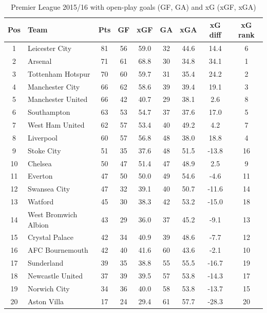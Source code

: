 \begin{table}[!h]
\centering
\small
\begin{tabular}{|c|l|c|c|c|c|c|c|c|}
\hline
\textbf{Pos} & \textbf{Team} & \textbf{Pts} & \textbf{GF} & \textbf{xGF} & \textbf{GA} & \textbf{xGA} & \textbf{xG diff} & \textbf{xG rank} \\
\hline
1 & Leicester City & 81 & 56 & 59.0 & 32 & 44.6 & 14.4 & 6 \\
2 & Arsenal & 71 & 61 & 68.8 & 30 & 34.8 & 34.1 & 1 \\
3 & Tottenham Hotspur & 70 & 60 & 59.7 & 31 & 35.4 & 24.2 & 2 \\
4 & Manchester City & 66 & 62 & 58.6 & 39 & 39.4 & 19.1 & 3 \\
5 & Manchester United & 66 & 42 & 40.7 & 29 & 38.1 & 2.6 & 8 \\
6 & Southampton & 63 & 53 & 54.7 & 37 & 37.6 & 17.0 & 5 \\
7 & West Ham United & 62 & 57 & 53.4 & 40 & 49.2 & 4.2 & 7 \\
8 & Liverpool & 60 & 57 & 56.8 & 48 & 38.0 & 18.8 & 4 \\
9 & Stoke City & 51 & 35 & 37.6 & 48 & 51.5 & -13.8 & 16 \\
10 & Chelsea & 50 & 47 & 51.4 & 47 & 48.9 & 2.5 & 9 \\
11 & Everton & 47 & 50 & 50.0 & 49 & 54.6 & -4.6 & 11 \\
12 & Swansea City & 47 & 32 & 39.1 & 40 & 50.7 & -11.6 & 14 \\
13 & Watford & 45 & 30 & 38.3 & 42 & 53.2 & -15.0 & 18 \\
14 & West Bromwich Albion & 43 & 29 & 36.0 & 37 & 45.2 & -9.1 & 13 \\
15 & Crystal Palace & 42 & 34 & 40.9 & 39 & 48.6 & -7.7 & 12 \\
16 & AFC Bournemouth & 42 & 40 & 41.6 & 60 & 43.6 & -2.1 & 10 \\
17 & Sunderland & 39 & 35 & 38.8 & 55 & 55.5 & -16.7 & 19 \\
18 & Newcastle United & 37 & 39 & 39.5 & 57 & 53.8 & -14.3 & 17 \\
19 & Norwich City & 34 & 36 & 40.0 & 58 & 53.8 & -13.7 & 15 \\
20 & Aston Villa & 17 & 24 & 29.4 & 61 & 57.7 & -28.3 & 20 \\
\hline
\end{tabular}
\caption{Premier League 2015/16 with open-play goals (GF, GA) and xG (xGF, xGA)}
\label{tab:pl}
\end{table}

